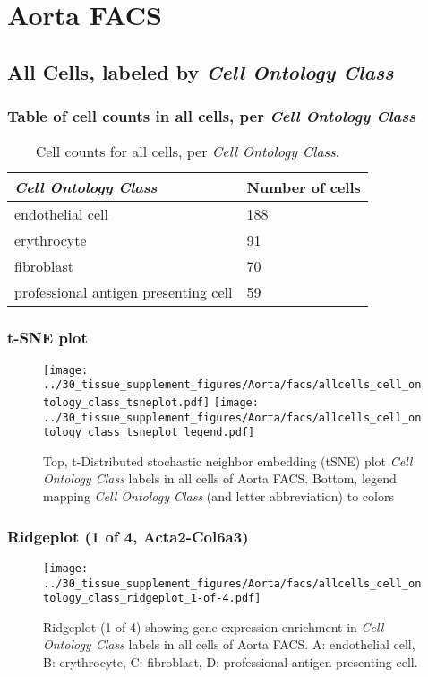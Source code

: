 \clearpage
\section{Aorta FACS}

\subsection{All Cells, labeled by \emph{Cell Ontology Class}}
\subsubsection{Table of cell counts in all cells, per \emph{Cell Ontology Class}}\begin{table}[h]
\centering
\label{my-label}
\begin{tabular}{@{}ll@{}}
\toprule

\emph{Cell Ontology Class}& Number of cells \\ \midrule
endothelial cell & 188 \\

erythrocyte & 91 \\

fibroblast & 70 \\

professional antigen presenting cell & 59 \\
\bottomrule
\end{tabular}
\caption{Cell counts for all cells, per \emph{Cell Ontology Class}.}
\end{table}

\clearpage
\subsubsection{t-SNE plot}
\begin{figure}[h]
\centering
\texttt{[image: ../30\_tissue\_supplement\_figures/Aorta/facs/allcells\_cell\_ontology\_class\_tsneplot.pdf]}
\texttt{[image: ../30\_tissue\_supplement\_figures/Aorta/facs/allcells\_cell\_ontology\_class\_tsneplot\_legend.pdf]}
\caption{Top, t-Distributed stochastic neighbor embedding (tSNE) plot  \emph{Cell Ontology Class} labels in all cells of Aorta FACS. Bottom, legend mapping \emph{Cell Ontology Class} (and letter abbreviation) to colors}
\end{figure}


\clearpage

\subsubsection{Ridgeplot (1 of 4, Acta2-Col6a3)}
\begin{figure}[h]
\centering
\texttt{[image: ../30\_tissue\_supplement\_figures/Aorta/facs/allcells\_cell\_ontology\_class\_ridgeplot\_1-of-4.pdf]}

\caption{ Ridgeplot (1 of 4)  showing gene expression enrichment in \emph{Cell Ontology Class} labels in all cells of Aorta FACS. A: endothelial cell, B: erythrocyte, C: fibroblast, D: professional antigen presenting cell.}
\end{figure}


